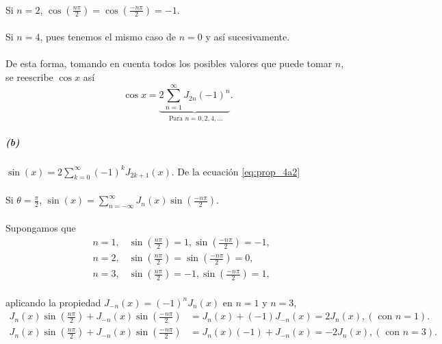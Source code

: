 \documentclass{article}
\begin{document}
\paragraph{}Si $n=2$, $\cos{\left(\frac{n\pi}{2}\right)} = \cos{\left(\frac{-n\pi}{2}\right)} = -1.$
\paragraph{}Si $n=4$, pues tenemos el mismo caso de $n=0$ y así sucesivamente.
\paragraph{}De esta forma, tomando en cuenta todos los posibles valores que puede tomar $n$, se reescribe $\cos{x}$ así
$$
\cos{x} = \underbrace{2 \sum_{n=1}^{\infty} J_{2n}(-1)^n}_{\text{ Para } n = 0, 2, 4, \dots}.
$$
\subparagraph{(b)} $\sin{(x)} = 2 \sum_{k=0}^{\infty} (-1)^k J_{2k+1}(x).$ De la ecuación \eqref{eq:prop_4a2}
\paragraph{}Si $\theta = \frac{\pi}{2}$, $\sin{(x)} = \sum_{n=-\infty}^{\infty} J_n(x) \sin{\left(\frac{-n\pi}{2}\right)}.$
\paragraph{}Supongamos que
\begin{align*}
&n=1, \hspace{10pt} \sin{\left(\frac{n\pi}{2}\right)} = 1, \sin{\left(\frac{-n\pi}{2}\right)} = -1,\\
&n=2, \hspace{10pt} \sin{\left(\frac{n\pi}{2}\right)} = \sin{\left(\frac{-n\pi}{2}\right)} = 0,\\
&n=3, \hspace{10pt} \sin{\left(\frac{n\pi}{2}\right)} = -1, \sin{\left(\frac{-n\pi}{2}\right)} = 1,
\end{align*}
\paragraph{}aplicando la propiedad $J_{-n}(x) = (-1)^n J_n(x)$ en $n=1$ y $n=3$,
\begin{align*}
J_n(x)\sin{\left(\frac{n\pi}{2}\right)} + J_{-n}(x)\sin{\left(\frac{-n\pi}{2}\right)} &= J_n(x) + (-1) J_{-n}(x) = 2J_n(x), (\text{ con } n=1).\\
J_n(x)\sin{\left(\frac{n\pi}{2}\right)} + J_{-n}(x)\sin{\left(\frac{-n\pi}{2}\right)} &= J_n(x)(-1) + J_{-n}(x) = -2J_n(x), (\text{ con } n=3).
\end{align*}
\end{document}
